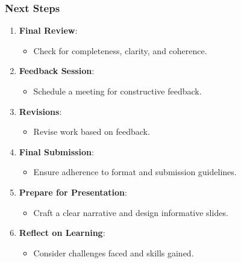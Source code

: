 \documentclass[aspectratio=169]{beamer}
\begin{document}
\begin{frame}[fragile]
    \frametitle{Next Steps}
    \begin{enumerate}
        \item \textbf{Final Review}:
            \begin{itemize}
                \item Check for completeness, clarity, and coherence.
            \end{itemize}
        \item \textbf{Feedback Session}:
            \begin{itemize}
                \item Schedule a meeting for constructive feedback.
            \end{itemize}
        \item \textbf{Revisions}:
            \begin{itemize}
                \item Revise work based on feedback.
            \end{itemize}
        \item \textbf{Final Submission}:
            \begin{itemize}
                \item Ensure adherence to format and submission guidelines.
            \end{itemize}
        \item \textbf{Prepare for Presentation}:
            \begin{itemize}
                \item Craft a clear narrative and design informative slides.
            \end{itemize}
        \item \textbf{Reflect on Learning}:
            \begin{itemize}
                \item Consider challenges faced and skills gained.
            \end{itemize}
    \end{enumerate}
\end{frame}
\end{document}
